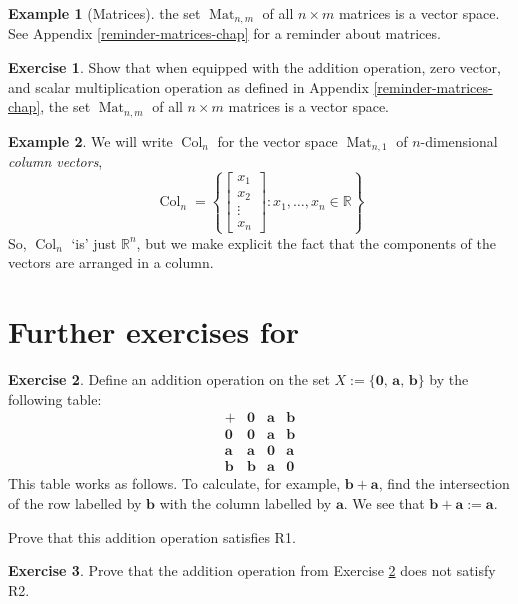 \documentclass[a4paper,11pt]{book}
\theoremstyle{definition}
\newtheorem{exercise}{Exercise}
\newtheorem{example_environment}{Example}[chapter]
\newcommand{\ve}[1]{\mathbf{#1}}
\newcommand{\furtherexercises}{\section*{Further exercises for \thesection}}
\newenvironment{example}
	{
		\begin{oframed} 
		\begin{example_environment}
	}
	{
		\end{example_environment}
		\end{oframed}
	}
\DeclareMathOperator{\Mat}{Mat}
\DeclareMathOperator{\Col}{Col}
\begin{document}
\begin{example}[Matrices] \label{matrices_example_vec_space} the set $\Mat_{n, m}$ of all $n \times m$ matrices is a vector space. See Appendix \ref{reminder-matrices-chap} for a reminder about matrices.

\begin{exercise} Show that when equipped with the addition operation, zero vector, and scalar multiplication operation as defined in Appendix \ref{reminder-matrices-chap}, the set $\Mat_{n, m}$ of all $n \times m$ matrices is a vector space. 
\end{exercise}
\end{example}

\begin{example} We will write $\Col_n$ for the vector space $\Mat_{n,1}$ of $n$-dimensional {\em column vectors},
\[
 \Col_n = \left\{ \left[ \begin{array}{c} x_1 \\ x_2 \\ \vdots \\ x_n \end{array} \right] : x_1, \ldots, x_n \in \mathbb{R} \right\}
\]
So, $\Col_n$ `is' just $\mathbb{R}^n$, but we make explicit the fact that the components of the vectors are arranged in a column. 
\end{example}



\furtherexercises
\begin{exercise} \label{non_ass_ex} Define an addition operation on the set $X := \{ \ve{0}, \, \ve{a}, \, \ve{b} \}$ by the following table:
\[
 \begin{array}{c|ccc}
 	+ & \ve{0} & \ve{a} & \ve{b} \\ 
 	\hline
 	\ve{0} & \ve{0} & \ve{a} & \ve{b} \\
 	\ve{a} & \ve{a} & \ve{0} & \ve{a} \\
 	\ve{b} & \ve{b} & \ve{a} & \ve{0}
 \end{array}
\]
This table works as follows. To calculate, for example, $\ve{b} + \ve{a}$, find the intersection of the row labelled by $\ve{b}$ with the column labelled by $\ve{a}$. We see that $\ve{b} + \ve{a} := \ve{a}$. 

Prove that this addition operation satisfies R1.
\end{exercise}

\begin{exercise} Prove that the addition operation from Exercise \ref{non_ass_ex} does not satisfy R2.
\end{exercise}
\end{document}
